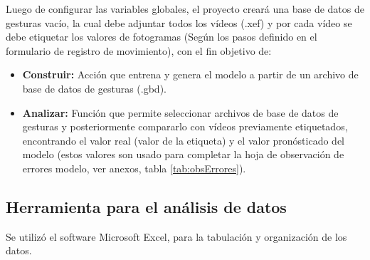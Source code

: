 Luego de configurar las variables globales, el proyecto crear\'a una base de datos de gesturas vac\'io, la cual debe adjuntar todos los v\'ideos (.xef)  y por cada v\'ideo se debe etiquetar los valores de fotogramas (Seg\'un los pasos definido en el formulario de registro de movimiento), con el fin objetivo de: 
\begin{itemize}
\item \textbf{Construir:} Acci\'on que entrena y genera el modelo a partir de un archivo de base de datos de gesturas (.gbd).
\item \textbf{Analizar:} Funci\'on que permite seleccionar archivos de base de datos de gesturas y posteriormente compararlo con v\'ideos previamente etiquetados, encontrando el valor real (valor de la etiqueta) y el valor pron\'osticado del modelo (estos valores son usado para completar la hoja de observaci\'on de errores modelo, ver anexos, tabla \ref{tab:obsErrores}).
\end{itemize}
\subsection{Herramienta para el an\'alisis de datos} \label{ins:toolsAn}
Se utiliz\'o el software Microsoft Excel, para la tabulaci\'on y organizaci\'on de los datos.
